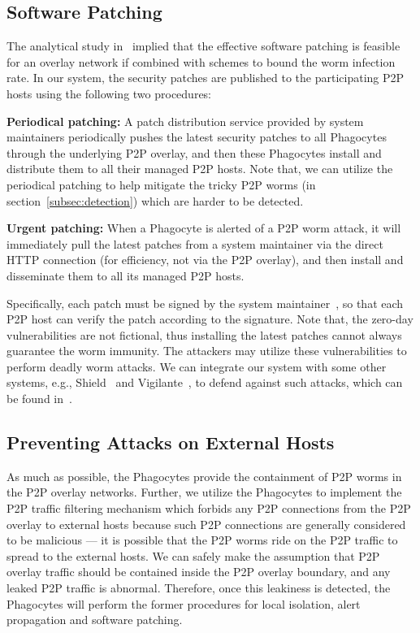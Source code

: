 \documentclass[times,10pt,twocolumn]{article}
\begin{document}
\subsection{Software Patching}
\label{subsec:patching}

The analytical study in~\cite{1103634} implied that the effective
software patching is feasible for an overlay network if combined
with schemes to bound the worm infection rate. In our system, the
security patches are published to the participating P2P hosts using
the following two procedures:



\textbf{Periodical patching:} A patch distribution service provided
by system maintainers periodically pushes the latest security
patches to all Phagocytes through the underlying P2P overlay, and
then these Phagocytes install and distribute them to all their
managed P2P hosts. Note that, we can utilize the periodical patching
to help mitigate the tricky P2P worms (in
section~\ref{subsec:detection}) which are harder to be detected.

\textbf{Urgent patching:} When a Phagocyte is alerted of a P2P worm
attack, it will immediately pull the latest patches from a system
maintainer via the direct HTTP connection (for efficiency, not via
the P2P overlay), and then install and disseminate them to all its
managed P2P hosts.



Specifically, each patch must be signed by the system
maintainer~\cite{XieSZ08}, so that each P2P host can verify the
patch according to the signature. Note that, the zero-day
vulnerabilities are not fictional, thus installing the latest
patches cannot always guarantee the worm immunity. The attackers may
utilize these vulnerabilities to perform deadly worm attacks. We can
integrate our system with some other systems, e.g.,
Shield~\cite{WangGSZ04} and Vigilante~\cite{1095824}, to defend
against such attacks, which can be found in~\cite{puzzle-Chen09}.




\subsection{Preventing Attacks on External Hosts}

As much as possible, the Phagocytes provide the containment of P2P
worms in the P2P overlay networks. Further, we utilize the
Phagocytes to implement the P2P traffic filtering mechanism which
forbids any P2P connections from the P2P overlay to external hosts
because such P2P connections are generally considered to be
malicious --- it is possible that the P2P worms ride on the P2P
traffic to spread to the external hosts. We can safely make the
assumption that P2P overlay traffic should be contained inside the
P2P overlay boundary, and any leaked P2P traffic is abnormal.
Therefore, once this leakiness is detected, the Phagocytes will
perform the former procedures for local isolation, alert propagation
and software patching.
\end{document}
